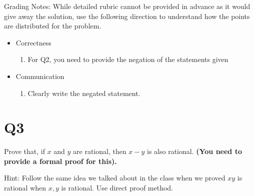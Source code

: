 \documentclass[12pt]{exam}
\begin{document}
Grading Notes:
While detailed rubric cannot be provided in advance as it would give away the solution, use the following direction to understand how the points are distributed for the problem.
\begin{itemize}
    \item Correctness
    \begin{enumerate}
        \item For Q2, you need to provide the negation of the statements given
    \end{enumerate}
        
    \item Communication 
        \begin{enumerate}
            \item Clearly write the negated statement.
        \end{enumerate}
\end{itemize}


\section{Q3}
Prove that, if $x$ and $y$ are rational, then $x-y$ is also rational. \textbf{(You need to provide a formal proof for this).}

Hint: Follow the same idea we talked about in the class when we proved $xy$ is rational when $x,y$ is rational. Use direct proof method.
\end{document}
